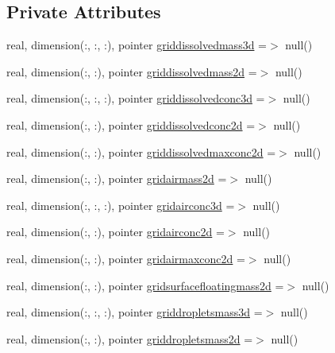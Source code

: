 \subsection*{Private Attributes}
\begin{DoxyCompactItemize}
\item 
real, dimension(\+:, \+:, \+:), pointer \mbox{\hyperlink{structmodulelagrangianglobal_1_1t__hns_a3394f85e7a1dcdc858ffbda48d76feab}{griddissolvedmass3d}} =$>$ null()
\item 
real, dimension(\+:, \+:), pointer \mbox{\hyperlink{structmodulelagrangianglobal_1_1t__hns_a793d0f712c04a1ce108360f53b889184}{griddissolvedmass2d}} =$>$ null()
\item 
real, dimension(\+:, \+:, \+:), pointer \mbox{\hyperlink{structmodulelagrangianglobal_1_1t__hns_a6f8a66a65c632dd5cfcf3e4bae06e39f}{griddissolvedconc3d}} =$>$ null()
\item 
real, dimension(\+:, \+:), pointer \mbox{\hyperlink{structmodulelagrangianglobal_1_1t__hns_acc902010642acec0259d88a20c8cd2dd}{griddissolvedconc2d}} =$>$ null()
\item 
real, dimension(\+:, \+:), pointer \mbox{\hyperlink{structmodulelagrangianglobal_1_1t__hns_ac24b8f5e0ccfa8855b00120fbdfeecea}{griddissolvedmaxconc2d}} =$>$ null()
\item 
real, dimension(\+:, \+:), pointer \mbox{\hyperlink{structmodulelagrangianglobal_1_1t__hns_a149ae167309a39f556fa0be369b97c42}{gridairmass2d}} =$>$ null()
\item 
real, dimension(\+:, \+:, \+:), pointer \mbox{\hyperlink{structmodulelagrangianglobal_1_1t__hns_a0ba1b48a0b6bd91437d76729e498df1c}{gridairconc3d}} =$>$ null()
\item 
real, dimension(\+:, \+:), pointer \mbox{\hyperlink{structmodulelagrangianglobal_1_1t__hns_aa6b9d6d1c1f75ee107e57d3d92cbb832}{gridairconc2d}} =$>$ null()
\item 
real, dimension(\+:, \+:), pointer \mbox{\hyperlink{structmodulelagrangianglobal_1_1t__hns_a29f8449513fa8986462bb5becb5f1a7c}{gridairmaxconc2d}} =$>$ null()
\item 
real, dimension(\+:, \+:), pointer \mbox{\hyperlink{structmodulelagrangianglobal_1_1t__hns_ad3a37b342843563bccf18313e9cb416e}{gridsurfacefloatingmass2d}} =$>$ null()
\item 
real, dimension(\+:, \+:, \+:), pointer \mbox{\hyperlink{structmodulelagrangianglobal_1_1t__hns_a5b66a335184d5af07db61ab400e3c71b}{griddropletsmass3d}} =$>$ null()
\item 
real, dimension(\+:, \+:), pointer \mbox{\hyperlink{structmodulelagrangianglobal_1_1t__hns_abbb99114aa493ed4d2b6fe874f2a5cc2}{griddropletsmass2d}} =$>$ null()

\end{DoxyCompactItemize}
